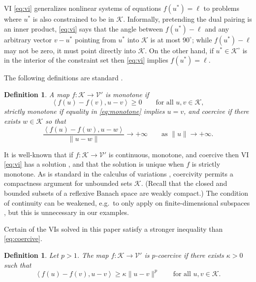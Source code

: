 \documentclass[letterpaper,final,12pt,reqno]{amsart}
\theoremstyle{cstyle}
\theoremstyle{cstyle*}
\theoremstyle{dstyle}
\newtheorem{definition}[theorem]{Definition}
\numberwithin{equation}{section}
\numberwithin{figure}{section}
\numberwithin{table}{section}
\numberwithin{theorem}{section}
\newcommand{\cK}{\mathcal{K}}
\newcommand{\cV}{\mathcal{V}}
\newcommand{\ip}[2]{\left<#1,#2\right>}
\begin{document}
VI \eqref{eq:vi} generalizes nonlinear systems of equations $f(u^*)=\ell$ to problems where $u^*$ is also constrained to be in $\cK$.  Informally, pretending the dual pairing is an inner product, \eqref{eq:vi} says that the angle between $f(u^*)-\ell$ and any arbitrary vector $v-u^*$ pointing from $u^*$ into $\cK$ is at most $90^\circ$; while $f(u^*)-\ell$ may not be zero, it must point directly into $\cK$.  On the other hand, if $u^*\in\cK^\circ$ is in the interior of the constraint set then \eqref{eq:vi} implies $f(u^*)=\ell$.

The following definitions are standard \cite{KinderlehrerStampacchia1980}.

\begin{definition}  A map $f:\cK \to \cV'$ is \emph{monotone} if
\begin{equation}
\ip{f(u)-f(v)}{u-v} \ge 0 \qquad \text{for all } u,v \in \cK, \label{eq:monotone}
\end{equation}
\emph{strictly monotone} if equality in \eqref{eq:monotone} implies $u=v$, and \emph{coercive} if there exists $w \in \cK$ so that
\begin{equation}
\frac{\ip{f(u)-f(w)}{u-w}}{\|u-w\|} \to +\infty \qquad \text{as } \|u\|\to +\infty. \label{eq:coercive}
\end{equation}
\end{definition}

It is well-known that if $f:\cK \to \cV'$ is continuous, monotone, and coercive then VI \eqref{eq:vi} has a solution \cite[Corollary III.1.8]{KinderlehrerStampacchia1980}, and that the solution is unique when $f$ is strictly monotone.  As is standard in the calculus of variations \cite{Evans2010}, coercivity permits a compactness argument for unbounded sets $\cK$.  (Recall that the closed and bounded subsets of a reflexive Banach space are weakly compact.)  The condition of continuity can be weakened, e.g.~to only apply on finite-dimensional subspaces \cite{KinderlehrerStampacchia1980}, but this is unnecessary in our examples.

Certain of the VIs solved in this paper satisfy a stronger inequality than \eqref{eq:coercive}.

\begin{definition}  Let $p>1$.  The map $f:\cK \to \cV'$ is \emph{$p$-coercive} if there exists $\kappa>0$ such that
\begin{equation}
\ip{f(u)-f(v)}{u-v} \ge \kappa \|u-v\|^p \qquad \text{for all } u,v \in \cK. \label{eq:pcoercive}
\end{equation}
\end{definition}
\end{document}

